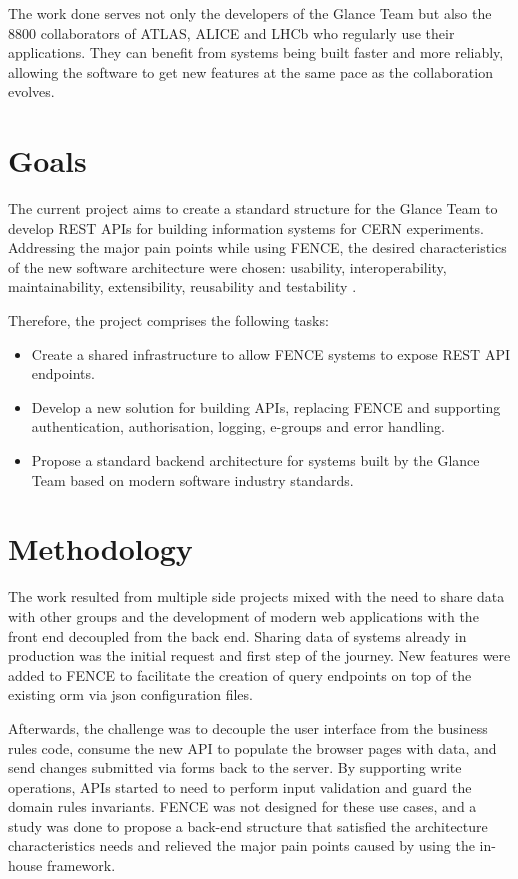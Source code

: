 The work done serves not only the developers of the Glance Team but also the 8800 collaborators of ATLAS, ALICE and LHCb who regularly use their applications. They can benefit from systems being built faster and more reliably, allowing the software to get new features at the same pace as the collaboration evolves.

\section{Goals}

The current project aims to create a standard structure for the Glance Team to develop REST APIs for building information systems for CERN experiments. Addressing the major pain points while using FENCE, the desired characteristics of the new software architecture were chosen: usability, interoperability, maintainability, extensibility, reusability and testability \cite{richards-architecture}.

Therefore, the project comprises the following tasks:
\begin{itemize}
    \item Create a shared infrastructure to allow FENCE systems to expose REST API endpoints.
    \item Develop a new solution for building APIs, replacing FENCE and supporting authentication, authorisation, logging, e-groups and error handling.
    \item Propose a standard backend architecture for systems built by the Glance Team based on modern software industry standards.
\end{itemize}


\section{Methodology}

The work resulted from multiple side projects mixed with the need to share data with other groups and the development of modern web applications with the front end decoupled from the back end. Sharing data of systems already in production was the initial request and first step of the journey. New features were added to FENCE to facilitate the creation of query endpoints on top of the existing \acrfull{orm} via \acrshort{json} configuration files.

Afterwards, the challenge was to decouple the user interface from the business rules code, consume the new API to populate the browser pages with data, and send changes submitted via forms back to the server. By supporting write operations, APIs started to need to perform input validation and guard the domain rules invariants. FENCE was not designed for these use cases, and a study was done to propose a back-end structure that satisfied the architecture characteristics needs and relieved the major pain points caused by using the in-house framework.

